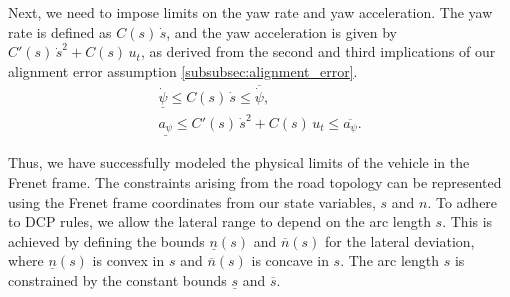 Next, we need to impose limits on the yaw rate and yaw acceleration.
The yaw rate is defined as \(C(s)\,\dot{s}\), and the yaw acceleration is given by \(C'(s)\,\dot{s}^2 + C(s)\,u_t\), as derived from the second and
third implications of our alignment error assumption \ref{subsubsec:alignment_error}.
\begin{align}
	\underline{\dot{\psi}} \leq C(s)\,\dot{s} \leq \overline{\dot{\psi}}, \\
	\underline{a_{\psi}} \leq C'(s)\,\dot{s}^2 + C(s)\,u_t \leq \overline{a_{\psi}}.
\end{align}

Thus, we have successfully modeled the physical limits of the vehicle in the Frenet frame.
The constraints arising from the road topology can be represented using the Frenet frame coordinates from our state variables, \(s\) and \(n\).
To adhere to DCP rules, we allow the lateral range to depend on the arc length \(s\).
This is achieved by defining the bounds \(\underline{n}(s)\) and \(\overline{n}(s)\) for the lateral deviation, where \(\underline{n}(s)\) is convex
in \(s\) and \(\overline{n}(s)\) is concave in \(s\).
The arc length \(s\) is constrained by the constant bounds \(\underline{s}\) and \(\overline{s}\).

